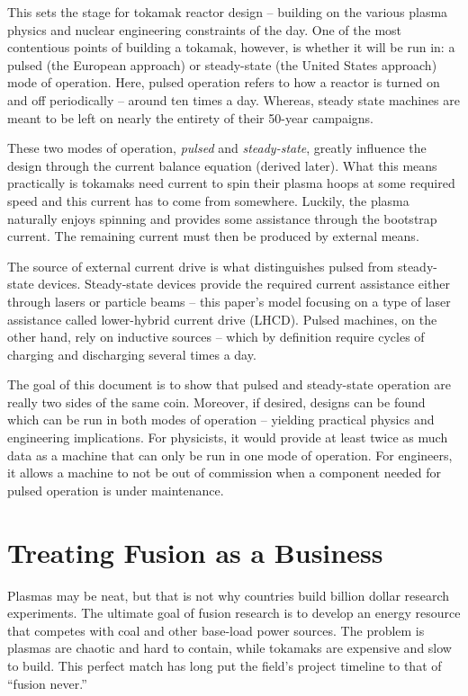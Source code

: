 This sets the stage for tokamak reactor design -- building on the various plasma physics and nuclear engineering constraints of the day. One of the most contentious points of building a tokamak, however, is whether it will be run in: a pulsed (the European approach) or steady-state (the United States approach) mode of operation. Here, pulsed operation refers to how a reactor is turned on and off periodically -- around ten times a day. Whereas, steady state machines are meant to be left on nearly the entirety of their 50-year campaigns.

These two modes of operation, \emph{pulsed} and \emph{steady-state}, greatly influence the design through the current balance equation (derived later). What this means practically is tokamaks need current to spin their plasma hoops at some required speed and this current has to come from somewhere. Luckily, the plasma naturally enjoys spinning and provides some assistance through the bootstrap current. The remaining current must then be produced by external means.

The source of external current drive is what distinguishes pulsed from steady-state devices. Steady-state devices provide the required current assistance either through lasers or particle beams -- this paper's model focusing on a type of laser assistance called lower-hybrid current drive (LHCD). Pulsed machines, on the other hand, rely on inductive sources -- which by definition require cycles of charging and discharging several times a day.

The goal of this document is to show that pulsed and steady-state operation are really two sides of the same coin. Moreover, if desired, designs can be found which can be run in both modes of operation -- yielding practical physics and engineering implications. For physicists, it would provide at least twice as much data as a machine that can only be run in one mode of operation. For engineers, it allows a machine to not be out of commission when a component needed for pulsed operation is under maintenance.

\section{Treating Fusion as a Business}

Plasmas may be neat, but that is not why countries build billion dollar research experiments. The ultimate goal of fusion research is to develop an energy resource that competes with coal and other base-load power sources. The problem is plasmas are chaotic and hard to contain, while tokamaks are expensive and slow to build. This perfect match has long put the field's project timeline to that of ``fusion never.''

